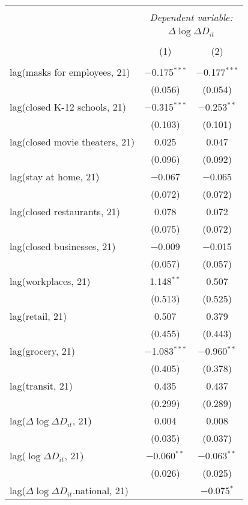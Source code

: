 \begin{tabular}{@{\extracolsep{1pt}}lcc} 
\\[-1.8ex]\hline 
\hline \\[-1.8ex] 
 & \multicolumn{2}{c}{\textit{Dependent variable:}} \\ 
\cline{2-3} 
 & \multicolumn{2}{c}{$\Delta \log \Delta D_{it}$} \\ 
\\[-1.8ex] & (1) & (2)\\ 
\hline \\[-1.8ex] 
 lag(masks for employees, 21) & $-$0.175$^{***}$ & $-$0.177$^{***}$ \\ 
  & (0.056) & (0.054) \\ 
  lag(closed K-12 schools, 21) & $-$0.315$^{***}$ & $-$0.253$^{**}$ \\ 
  & (0.103) & (0.101) \\ 
  lag(closed movie theaters, 21) & 0.025 & 0.047 \\ 
  & (0.096) & (0.092) \\ 
  lag(stay at home, 21) & $-$0.067 & $-$0.065 \\ 
  & (0.072) & (0.072) \\ 
  lag(closed restaurants, 21) & 0.078 & 0.072 \\ 
  & (0.075) & (0.072) \\ 
  lag(closed businesses, 21) & $-$0.009 & $-$0.015 \\ 
  & (0.057) & (0.057) \\ 
  lag(workplaces, 21) & 1.148$^{**}$ & 0.507 \\ 
  & (0.513) & (0.525) \\ 
  lag(retail, 21) & 0.507 & 0.379 \\ 
  & (0.455) & (0.443) \\ 
  lag(grocery, 21) & $-$1.083$^{***}$ & $-$0.960$^{**}$ \\ 
  & (0.405) & (0.378) \\ 
  lag(transit, 21) & 0.435 & 0.437 \\ 
  & (0.299) & (0.289) \\ 
  lag($\Delta \log \Delta D_{it}$, 21) & 0.004 & 0.008 \\ 
  & (0.035) & (0.037) \\ 
  lag($\log \Delta D_{it}$, 21) & $-$0.060$^{**}$ & $-$0.063$^{**}$ \\ 
  & (0.026) & (0.025) \\ 
  lag($\Delta \log \Delta D_{it}$.national, 21) &  & $-$0.075$^{*}$ \\ 

\end{tabular}
